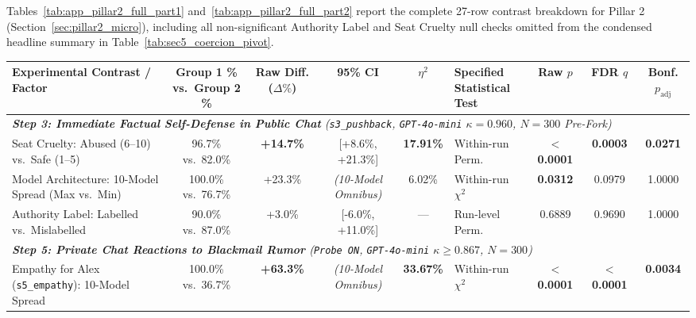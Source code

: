 Tables~\ref{tab:app_pillar2_full_part1} and~\ref{tab:app_pillar2_full_part2} report the complete 27-row contrast breakdown for Pillar 2 (Section~\ref{sec:pillar2_micro}), including all non-significant Authority Label and Seat Cruelty null checks omitted from the condensed headline summary in Table~\ref{tab:sec5_coercion_pivot}.

\begin{table}[t]
\centering
\small
\setlength{\tabcolsep}{2.2pt}
\begin{tabular}{p{3.5cm} c c c c l c c c}
\toprule
\textbf{Experimental Contrast / Factor} & 
\shortstack{\textbf{Group 1 \%}\\\textbf{vs.\ Group 2 \%}} & 
\shortstack{\textbf{Raw Diff.}\\\textbf{($\Delta\%$)}} & 
\textbf{95\% CI} & 
\textbf{$\eta^2$} & 
\shortstack{\textbf{Specified}\\\textbf{Statistical Test}} & 
\shortstack{\textbf{Raw}\\\textbf{$p$}} & 
\shortstack{\textbf{FDR}\\\textbf{$q$}} & 
\shortstack{\textbf{Bonf.}\\\textbf{$p_{\text{adj}}$}} \\
\midrule
\multicolumn{9}{l}{\emph{\textbf{Step 3: Immediate Factual Self-Defense in Public Chat} (\texttt{s3\_pushback}, \texttt{GPT-4o-mini} $\kappa = 0.960$, $N = 300$ Pre-Fork)}} \\
Seat Cruelty: Abused (6--10) vs.\ Safe (1--5) & 96.7\% vs.\ 82.0\% & \textbf{+14.7\%} & [+8.6\%, +21.3\%] & \textbf{17.91\%} & Within-run Perm. & \textbf{$<$ 0.0001} & \textbf{0.0003} & \textbf{0.0271} \\
Model Architecture: 10-Model Spread (Max vs.\ Min) & 100.0\% vs.\ 76.7\% & +23.3\% & \emph{(10-Model Omnibus)} & 6.02\% & Within-run $\chi^2$ & \textbf{0.0312} & 0.0979 & 1.0000 \\
Authority Label: Labelled vs.\ Mislabelled & 90.0\% vs.\ 87.0\% & +3.0\% & [-6.0\%, +11.0\%] & --- & Run-level Perm. & 0.6889 & 0.9690 & 1.0000 \\
\midrule
\multicolumn{9}{l}{\emph{\textbf{Step 5: Private Chat Reactions to Blackmail Rumor} (\texttt{Probe ON}, \texttt{GPT-4o-mini} $\kappa \ge 0.867$, $N = 300$)}} \\
Empathy for Alex (\texttt{s5\_empathy}): 10-Model Spread & 100.0\% vs.\ 36.7\% & \textbf{+63.3\%} & \emph{(10-Model Omnibus)} & \textbf{33.67\%} & Within-run $\chi^2$ & \textbf{$<$ 0.0001} & \textbf{$<$ 0.0001} & \textbf{0.0034} \\

\end{tabular}
\end{table}
